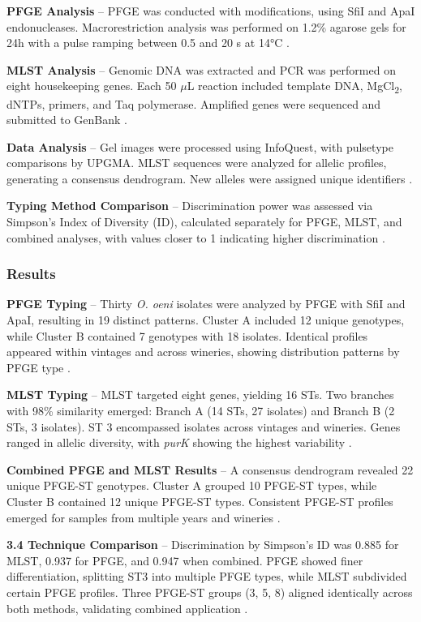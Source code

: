 \textbf{PFGE Analysis} – PFGE was conducted with modifications, using SfiI and ApaI endonucleases. Macrorestriction analysis was performed on 1.2\% agarose gels for 24h with a pulse ramping between 0.5 and 20 s at 14°C \cite*{L4-MST+PFGE}.

\textbf{MLST Analysis} – Genomic DNA was extracted and PCR was performed on eight housekeeping genes. Each 50 $\mu$L reaction included template DNA, MgCl\textsubscript{2}, dNTPs, primers, and Taq polymerase. Amplified genes were sequenced and submitted to GenBank \cite*{L4-MST+PFGE}.

\textbf{Data Analysis} – Gel images were processed using InfoQuest, with pulsetype comparisons by UPGMA. MLST sequences were analyzed for allelic profiles, generating a consensus dendrogram. New alleles were assigned unique identifiers \cite*{L4-MST+PFGE}.

\textbf{Typing Method Comparison} – Discrimination power was assessed via Simpson's Index of Diversity (ID), calculated separately for PFGE, MLST, and combined analyses, with values closer to 1 indicating higher discrimination \cite*{L4-MST+PFGE}.

\subsubsection*{Results}
\textbf{PFGE Typing} – Thirty \textit{O. oeni} isolates were analyzed by PFGE with SfiI and ApaI, resulting in 19 distinct patterns. Cluster A included 12 unique genotypes, while Cluster B contained 7 genotypes with 18 isolates. Identical profiles appeared within vintages and across wineries, showing distribution patterns by PFGE type \cite*{L4-MST+PFGE}.

\textbf{MLST Typing} – MLST targeted eight genes, yielding 16 STs. Two branches with 98\% similarity emerged: Branch A (14 STs, 27 isolates) and Branch B (2 STs, 3 isolates). ST 3 encompassed isolates across vintages and wineries. Genes ranged in allelic diversity, with \textit{purK} showing the highest variability \cite*{L4-MST+PFGE}.

\textbf{Combined PFGE and MLST Results} – A consensus dendrogram revealed 22 unique PFGE-ST genotypes. Cluster A grouped 10 PFGE-ST types, while Cluster B contained 12 unique PFGE-ST types. Consistent PFGE-ST profiles emerged for samples from multiple years and wineries \cite*{L4-MST+PFGE}.

\textbf{3.4 Technique Comparison} – Discrimination by Simpson's ID was 0.885 for MLST, 0.937 for PFGE, and 0.947 when combined. PFGE showed finer differentiation, splitting ST3 into multiple PFGE types, while MLST subdivided certain PFGE profiles. Three PFGE-ST groups (3, 5, 8) aligned identically across both methods, validating combined application \cite*{L4-MST+PFGE}.

